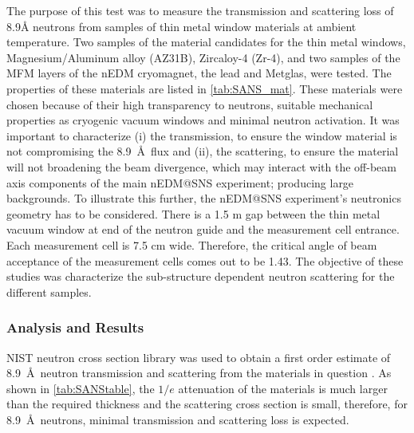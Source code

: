 The purpose of this test was to measure the transmission and scattering loss of 8.9Å neutrons from samples of thin metal window materials at ambient temperature. Two samples of the material candidates for the thin metal windows, Magnesium/Aluminum alloy (AZ31B), Zircaloy-4 (Zr-4), and two samples of the MFM layers of the nEDM cryomagnet, the lead and Metglas, were tested. The properties of these materials are listed in \cref{tab:SANS_mat}. These materials were chosen because of their high transparency to neutrons, suitable mechanical properties as cryogenic vacuum windows and minimal neutron activation. It was important to characterize (i) the transmission, to ensure the window material is not compromising the 8.9~\AA\ flux and (ii), the scattering, to ensure the material will not broadening the beam divergence, which may interact with the off-beam axis components of the main nEDM@SNS experiment; producing large backgrounds. To illustrate this further, the nEDM@SNS experiment's neutronics geometry has to be considered. There is a 1.5 m gap between the thin metal vacuum window at end of the neutron guide and the measurement cell entrance. Each measurement cell is 7.5 cm wide. Therefore, the critical angle of beam acceptance of the measurement cells comes out to be 1.43\degree. The objective of these studies was characterize the sub-structure dependent neutron scattering for the different samples.

\subsubsection{Analysis and Results}

NIST neutron cross section library was used to obtain a first order estimate of 8.9~\AA\ neutron transmission and scattering from the materials in question \cite{Sears1992}. As shown in \cref{tab:SANStable}, the $1/e$ attenuation of the materials is much larger than the required thickness and the scattering cross section is small, therefore, for 8.9~\AA\ neutrons, minimal transmission and scattering loss is expected.


